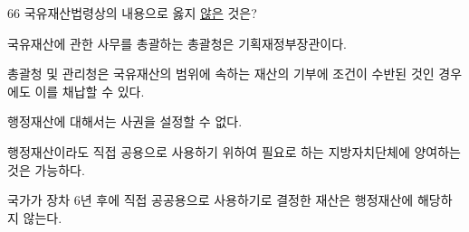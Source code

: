 \begin{question}{66}
국유재산법령상의 내용으로 옳지 \uline{않은} 것은?
\begin{choices}
  \item 국유재산에 관한 사무를 총괄하는 총괄청은 기획재정부장관이다.
  \item 총괄청 및 관리청은 국유재산의 범위에 속하는 재산의 기부에 조건이 수반된 것인 경우에도 이를 채납할 수 있다.
  \item 행정재산에 대해서는 사권을 설정할 수 없다.
  \item 행정재산이라도 직접 공용으로 사용하기 위하여 필요로 하는 지방자치단체에 양여하는 것은 가능하다.
  \item 국가가 장차 6년 후에 직접 공공용으로 사용하기로 결정한 재산은 행정재산에 해당하지 않는다.
\end{choices}
\end{question}

